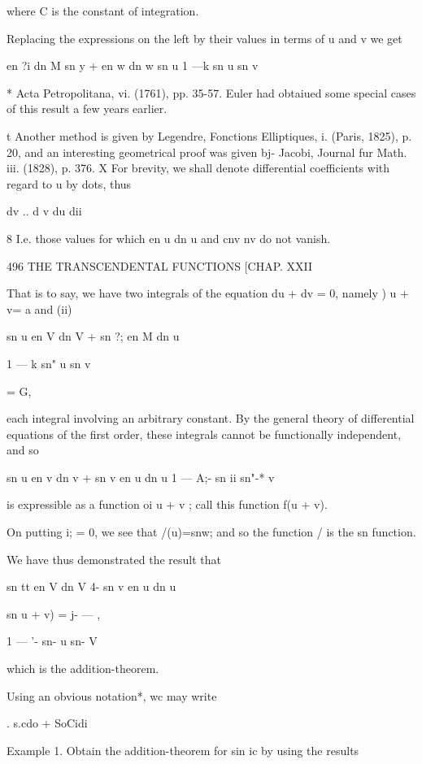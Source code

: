 where C is the constant of integration. 

Replacing the expressions on the left by their values in terms of u and v 
we get \ 

en ?i dn M sn y + en w dn w sn u   
1 —k  sn  u sn  v 

* Acta Petropolitana, vi. (1761), pp. 35-57. Euler had obtaiued some special cases of this 
result a few years earlier. 

t Another method is given by Legendre, Fonctions Elliptiques, i. (Paris, 1825), p. 20, and an 
interesting geometrical proof was given bj- Jacobi, Journal fur Math. iii. (1828), p. 376. 
X For brevity, we shall denote differential coefficients with regard to u by dots, thus 

dv .. d v 
du dii  

8 I.e. those values for which en u dn u and cnv  nv do not vanish. 



496 THE TRANSCENDENTAL FUNCTIONS [CHAP. XXII 

That is to say, we have two integrals of the equation du + dv = 0, namely 
  ) u + v= a and (ii) 

sn u en V dn V + sn ?; en M dn u 



1 — k  sn"  u sn  v 



= G, 



each integral involving an arbitrary constant. By the general theory of 
differential equations of the first order, these integrals cannot be functionally 
independent, and so 

sn u en v dn v + sn v en u dn u 
1 — A;- sn  ii sn"-* v 

is expressible as a function oi u + v ; call this function f(u + v). 

On putting i; = 0, we see that /(u)=snw; and so the function / is the 
sn function. 

We have thus demonstrated the result that 

sn tt en V dn V 4- sn v en u dn u 

sn  u + v) = j-  — , 

1 —  '- sn- u sn- V 

which is the addition-theorem. 

Using an obvious notation*, wc may write 

. s.cdo + SoCidi 

Example 1. Obtain the addition-theorem for sin ic by using the results 

